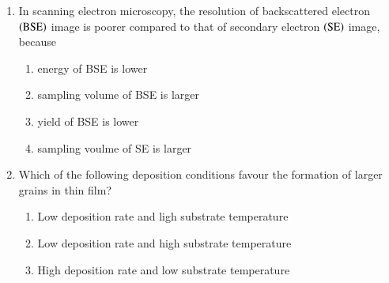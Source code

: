 \documentclass[journal]{IEEEtran}
\numberwithin{equation}{enumi}
\numberwithin{figure}{enumi}
\begin{document}
\begin{enumerate}
\begin{multicols}{2}
			\textbf{Column I} \\
			(P) Eutectoid reaction \\
			(Q) Martensitic transformation \\
			(R) Precipitation reaction
			\columnbreak \\
			\textbf{Column II} \\
			(1) involves no diffusion \\
			(2) one solid phase tranforms into two solid phases \\
			(3) occurs in supersaturated solutions
		\end{multicols}
		\begin{enumerate}                                                            
                        \item P - 2; Q - 3; R - 1
                        \item P - 1; Q - 2; R - 3                        
                        \item P - 2; Q - 1; R - 3
                        \item P - 3; Q - 2; R - 1
                \end{enumerate}
	\item In scanning electron microscopy, the resolution of backscattered electron $\left(\text{BSE}\right)$ image is poorer compared to that of secondary electron $\left(\text{SE}\right)$ image, because
		\begin{enumerate}                                                            
                        \item energy of BSE is lower
                        \item sampling volume of BSE is larger                     
                        \item yield of BSE is lower
                        \item sampling voulme of SE is larger
                \end{enumerate}
	\item Which of the following deposition conditions favour the formation of larger grains in thin film?
		\begin{enumerate}                                                               
                        \item Low deposition rate and ligh substrate temperature
                        \item Low deposition rate and high substrate temperature
                        \item High deposition rate and low substrate temperature

\end{enumerate}
\end{enumerate}
\end{document}
